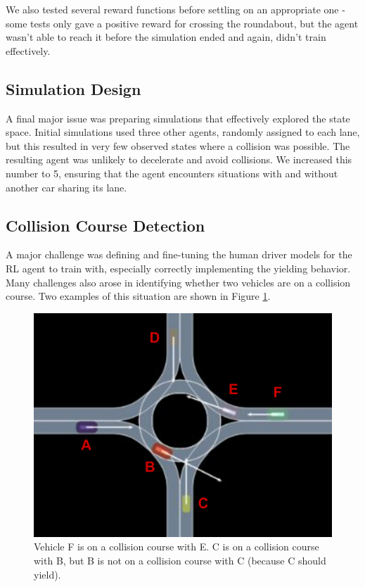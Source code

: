 \documentclass[conference]{IEEEtran}
\begin{document}
We also tested several reward functions before settling on an appropriate one - some tests only gave a positive reward for crossing the roundabout, but the agent wasn't able to reach it before the simulation ended and again, didn't train effectively.

\subsection*{Simulation Design} A final major issue was preparing simulations that effectively explored the state space. Initial simulations used three other agents, randomly assigned to each lane, but this resulted in very few observed states where a collision was possible. The resulting agent was unlikely to decelerate and avoid collisions. We increased this number to 5, ensuring that the agent encounters situations with and without another car sharing its lane.

\subsection*{Collision Course Detection}
A major challenge was defining and fine-tuning the human driver models for the RL agent to train with, especially correctly implementing the yielding behavior. Many challenges also arose in identifying whether two vehicles are on a collision course. Two examples of this situation are shown in Figure \ref{fig:collision}.

\begin{figure}[h!]
	\centering
\includegraphics[width=0.8\linewidth]{figures/example_roundabout.pdf}
\caption{Vehicle F is on a collision course with E. C is on a collision course with B, but B is not on a collision course with C (because C should yield).}
\label{fig:collision}
\end{figure}
\end{document}
